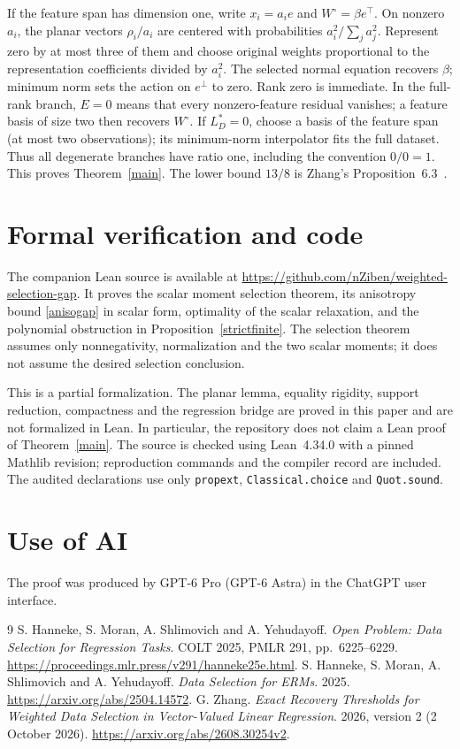 \documentclass[10pt]{article}
\begin{document}
If the feature span has dimension one, write $x_i=a_ie$ and
$W^\circ=\beta e^\top$. On nonzero $a_i$, the planar vectors
$\rho_i/a_i$ are centered with probabilities $a_i^2/\sum_j a_j^2$.
Represent zero by at most three of them and choose original weights
proportional to the representation coefficients divided by $a_i^2$.
The selected normal equation recovers $\beta$; minimum norm sets the action
on $e^\perp$ to zero. Rank zero is immediate.
In the full-rank branch, $E=0$ means that every nonzero-feature residual
vanishes; a feature basis of size two then recovers $W^\circ$.
If $L_D^*=0$, choose a basis of the feature span (at most two observations);
its minimum-norm interpolator fits the full dataset. Thus all degenerate
branches have ratio one, including the convention $0/0=1$.
This proves Theorem~\ref{main}. The lower bound $13/8$ is
Zhang's Proposition~6.3~\cite{zhang}.

\section{Formal verification and code}
The companion Lean source is available at
\url{https://github.com/nZiben/weighted-selection-gap}.
It proves the scalar moment selection theorem, its anisotropy bound
\eqref{anisogap} in scalar form, optimality of the scalar relaxation, and
the polynomial obstruction in Proposition~\ref{strictfinite}.
The selection theorem assumes only nonnegativity, normalization and the
two scalar moments; it does not assume the desired selection conclusion.

This is a partial formalization. The planar lemma, equality rigidity,
support reduction, compactness and the regression bridge are proved in
this paper and are not formalized in Lean. In particular, the repository
does not claim a Lean proof of Theorem~\ref{main}.
The source is checked using Lean~4.34.0 with a pinned Mathlib revision;
reproduction commands and the compiler record are included.
The audited declarations use only \texttt{propext},
\texttt{Classical.choice} and \texttt{Quot.sound}.

\section*{Use of AI}
The proof was produced by GPT-6 Pro (GPT-6 Astra) in the ChatGPT user interface.

\begin{thebibliography}{9}
S. Hanneke, S. Moran, A. Shlimovich and A. Yehudayoff.
\emph{Open Problem: Data Selection for Regression Tasks}.
COLT 2025, PMLR 291, pp.\ 6225--6229.
\url{https://proceedings.mlr.press/v291/hanneke25e.html}.
S. Hanneke, S. Moran, A. Shlimovich and A. Yehudayoff.
\emph{Data Selection for ERMs}. 2025.
\url{https://arxiv.org/abs/2504.14572}.
G. Zhang.
\emph{Exact Recovery Thresholds for Weighted Data Selection in Vector-Valued Linear Regression}.
2026, version 2 (2 October 2026).
\url{https://arxiv.org/abs/2608.30254v2}.
\end{thebibliography}
\end{document}
